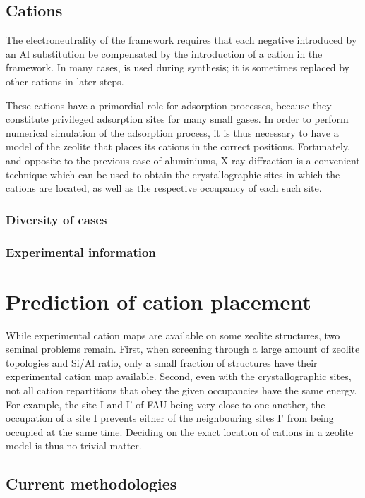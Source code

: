 \documentclass[main.tex]{subfiles}
\begin{document}
\subsection{Cations}

The electroneutrality of the framework requires that each negative introduced by an Al substitution be compensated by the introduction of a cation in the framework. In many cases,  is used during synthesis; it is sometimes replaced by other cations in later steps.

These cations have a primordial role for adsorption processes, because they constitute privileged adsorption sites for many small gases. In order to perform numerical simulation of the adsorption process, it is thus necessary to have a model of the zeolite that places its cations in the correct positions. Fortunately, and opposite to the previous case of aluminiums, X-ray diffraction is a convenient technique which can be used to obtain the crystallographic sites in which the cations are located, as well as the respective occupancy of each such site.

\subsubsection{Diversity of cases}


\subsubsection{Experimental information}


\section{Prediction of cation placement}

While experimental cation maps are available on some zeolite structures, two seminal problems remain. First, when screening through a large amount of zeolite topologies and Si/Al ratio, only a small fraction of structures have their experimental cation map available. Second, even with the crystallographic sites, not all cation repartitions that obey the given occupancies have the same energy. For example, the site I and I' of FAU being very close to one another, the occupation of a site I prevents either of the neighbouring sites I' from being occupied at the same time. Deciding on the exact location of cations in a zeolite model is thus no trivial matter.

\subsection{Current methodologies}
\end{document}
